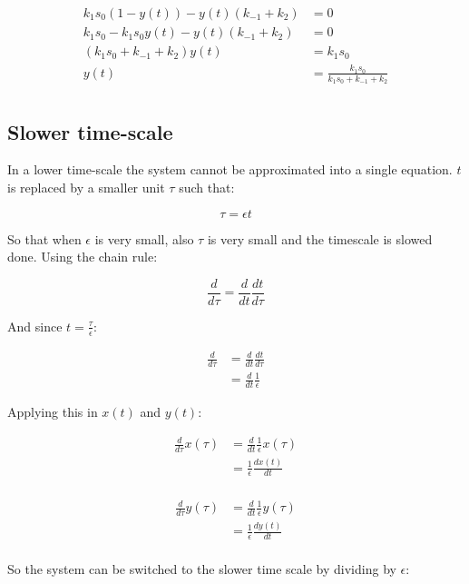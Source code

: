     \begin{align*}
      k_1s_0(1-y(t)) - y(t)(k_{-1}+k_2) &= 0\\
      k_1s_0 - k_1s_0y(t) - y(t)(k_{-1} + k_2) &= 0\\
      (k_1s_0 + k_{-1} + k_2)y(t) &= k_1s_0\\
      y(t) &= \frac{k_1s_0}{k_1s_0 + k_{-1} + k_2}\\
    \end{align*}

  \subsection{Slower time-scale}
  In a lower time-scale the system cannot be approximated into a single equation.
  $t$ is replaced by a smaller unit $\tau$ such that:

  $$\tau = \epsilon t$$

  So that when $\epsilon$ is very small, also $\tau$ is very small and the timescale is slowed done.
  Using the chain rule:

  $$\frac{d}{d\tau} = \frac{d}{dt}\frac{dt}{d\tau}$$

  And since $t = \frac{\tau}{\epsilon}$:

  \begin{align*}
    \frac{d}{d\tau} &= \frac{d}{dt}\frac{dt}{d\tau}\\
                    &= \frac{d}{dt}\frac{1}{\epsilon}
  \end{align*}

  Applying this in $x(t)$ and $y(t)$:

  \begin{align*}
    \frac{d}{d\tau}x(\tau) &= \frac{d}{dt}\frac{1}{\epsilon}x(\tau)\\
                        &=\frac{1}{\epsilon}\frac{dx(t)}{dt}\\
  \end{align*}

  \begin{align*}
    \frac{d}{d\tau}y(\tau) &= \frac{d}{dt}\frac{1}{\epsilon}y(\tau)\\
                        &=\frac{1}{\epsilon}\frac{dy(t)}{dt}\\
  \end{align*}

  So the system can be switched to the slower time scale by dividing by $\epsilon$:

